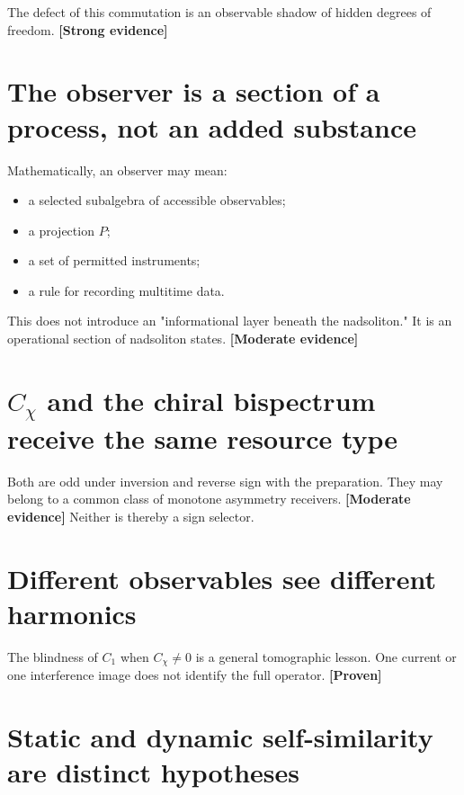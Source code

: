 \documentclass[11pt,a4paper,openany]{report}
\newcommand{\statusProven}{\textcolor{fingreen}{[Proven]}}
\newcommand{\statusStrong}{\textcolor{finblue}{[Strong evidence]}}
\newcommand{\statusModerate}{\textcolor{finviolet}{[Moderate evidence]}}
\begin{document}
The defect of this commutation is an observable shadow of hidden degrees of freedom. \textbf{\statusStrong{}}

\section{The observer is a section of a process, not an added substance}

Mathematically, an observer may mean:

\begin{itemize}
\item 
a selected subalgebra of accessible observables;

\item 
a projection \(P\);

\item 
a set of permitted instruments;

\item 
a rule for recording multitime data.

\end{itemize}

This does not introduce an "informational layer beneath the nadsoliton." It is an operational section of nadsoliton states. \textbf{\statusModerate{}}

\section{\texorpdfstring{\(C_\chi\) and the chiral bispectrum receive the same resource type}{C\_ and the chiral bispectrum receive the same resource type}}

Both are odd under inversion and reverse sign with the preparation. They may belong to a common class of monotone asymmetry receivers. \textbf{\statusModerate{}} Neither is thereby a sign selector.

\section{Different observables see different harmonics}

The blindness of \(C_1\) when \(C_\chi\neq0\) is a general tomographic lesson. One current or one interference image does not identify the full operator. \textbf{\statusProven{}}

\section{Static and dynamic self-similarity are distinct hypotheses}
\end{document}
